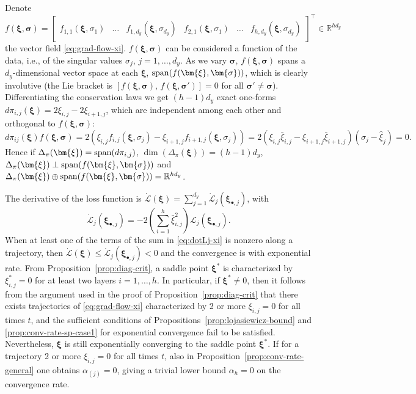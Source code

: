 \documentclass{article}
\newcommand{\1}{\mathds{1}}
\newcommand{\beq}{\begin{equation}}
\newcommand{\eeq}{\end{equation}}
\begin{document}
Denote $ f(\bm{\xi}, \bm{\sigma}) =\begin{bmatrix} f_{1,1} (\bm{\xi},\sigma_1) & \ldots & f_{1,d_y}  (\bm{\xi},\sigma_{d_y}) &  f_{2,1} (\bm{\xi},\sigma_1) & \ldots & f_{h,d_y} (\bm{\xi},\sigma_{d_y})  \end{bmatrix}^\top  \in \mathbb{R}^{h d_y } $ the vector field \eqref{eq:grad-flow-xi}. 
$ f(\bm{\xi}, \bm{\sigma}) $ can be considered a function of the data, i.e., of the singular values $ \sigma_j$, $ j=1, \ldots, d_y$. As we vary $ \bm{\sigma}$, $ f(\bm{\xi}, \bm{\sigma}) $ spans a $ d_y$-dimensional vector space at each $ \bm{\xi}$, $ {\rm span} ( f(\bm{\xi},\bm{\sigma})) $, which is clearly involutive (the Lie bracket is $ [  f(\bm{\xi}, \bm{\sigma}) , \,  f(\bm{\xi}, \bm{\sigma}') ]=0$ for all $ \bm{\sigma}' \neq \bm{\sigma} $). 
Differentiating the conservation laws we get $ (h-1) d_y $ exact one-forms $ d \pi_{i,j}(\bm{\xi}) = 2 \xi_{i,j} - 2 \xi_{i+1, j}$, which are independent among each other and orthogonal to $ f(\bm{\xi}, \bm{\sigma}) $: 
\[
d \pi_{ij}(\bm{\xi}) f(\bm{\xi}, \bm{\sigma}) = 2( \xi_{i,j} f_{i,j}(\bm{\xi}, \sigma_j) - \xi_{i+1,j} f_{i+1,j}(\bm{\xi},\sigma_j)) = 2( \xi_{i,j} \bar{\xi}_{i,j}  - \xi_{i+1,j} \bar{\xi}_{i+1,j} )(\sigma_j - \hat{\xi}_j)=0.
\]
Hence if $ \Delta_\pi(\bm{\xi}) = {\rm span} (d \pi_{i,j} ) $, $ \dim(\Delta_\pi(\bm{\xi})) = (h-1)d_y $, $ \Delta_\pi(\bm{\xi}) \perp {\rm span} ( f(\bm{\xi},\bm{\sigma}))  $ and $ \Delta_\pi(\bm{\xi}) \oplus {\rm span} ( f(\bm{\xi},\bm{\sigma}))  = \mathbb{R}^{h d_y}$.


The derivative of the loss function is $
\dot{\mathcal{L}}(\bm{\xi}) = \sum_{j=1}^{d_y} \dot{\mathcal{L}}_j( \bm{\xi}_{\bullet,j}) $, with
\beq
\label{eq:dotLj-xi}
\dot{\mathcal{L}}_j ( \bm{\xi}_{\bullet,j}) = - 2 \left( \sum_{i=1}^{h} \bar{\xi}_{i,j}^2 \right) \mathcal{L}_j ( \bm{\xi}_{\bullet,j}) .
\eeq
When at least one of the terms of the sum in \eqref{eq:dotLj-xi} is nonzero along a trajectory, then $\mathcal{\dot{\mathcal{L}}}(\bm{\xi}) \leq \dot{\mathcal{L}}_j( \bm{\xi}_{\bullet,j}) < 0$ and the convergence is with exponential rate.
From Proposition~\ref{prop:diag-crit}, a saddle point $ \bm{\xi}^\ast $ is characterized by $ \xi_{i,j}^\ast =0 $ for at least two layers $ i=1, \ldots, h$. In particular, if $ \bm{\xi}^\ast \neq 0$, then it follows from the argument used in the proof of Proposition~\ref{prop:diag-crit} that there exists trajectories of \eqref{eq:grad-flow-xi} characterized by 2 or more $ \xi_{i,j}=0$ for all times $ t$, and the sufficient conditions of Propositions~\ref{prop:lojasiewicz-bound} and \ref{prop:conv-rate-sp-case1} for exponential convergence fail to be satisfied. Nevertheless, $ \bm{\xi} $ is still exponentially converging to the saddle point $ \bm{\xi}^\ast$. If for a trajectory 2 or more $ \xi_{i,j}=0$ for all times $ t$, also in Proposition~\ref{prop:conv-rate-general} one obtains $\alpha_{(j)}=0$, giving a trivial lower bound $\alpha_h = 0$ on the convergence rate.
\end{document}

